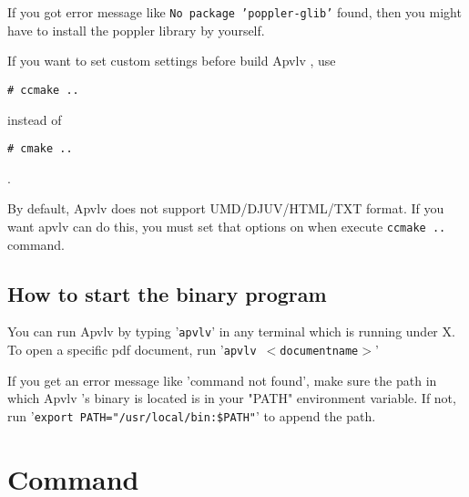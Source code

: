 \documentclass[a4paper,12pt]{article}
\newcommand{\apvlv}{\textsf{Apvlv{ }}}
\begin{document}
If you got error message like \texttt{No package 'poppler-glib'} found, then you might have to install the poppler library by yourself.

If you want to set custom settings before build \apvlv, use 
\begin{verbatim}
# ccmake ..
\end{verbatim}
instead of 
\begin{verbatim}
# cmake ..
\end{verbatim}.

By default, \apvlv does not support UMD/\-DJUV/\-HTML/\-TXT format. If you want apvlv can do this, you must set that options on when execute \texttt{ccmake ..} command.

\subsection{How to start the binary program}\label{sstart}

You can run \apvlv by typing '\texttt{apvlv}' in any terminal which is running under X. To open a specific pdf document, run '\texttt{apvlv $<$documentname$>$}'

If you get an error message like 'command not found', make sure the path in which \apvlv's binary is located is in your "PATH" environment variable. 
If not, run '\texttt{export PATH="/usr/local/bin:\$PATH"}' to append the path.

\newpage

\section{Command}\label{command}
\end{document}
